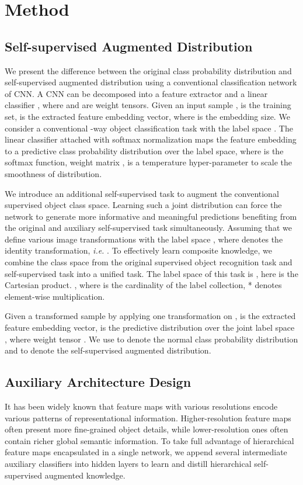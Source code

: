 \documentclass{article}
\begin{document}
\section{Method}
\subsection{Self-supervised Augmented Distribution}
We present the difference between the original class probability distribution and self-supervised augmented distribution using a conventional classification network of CNN. A CNN can be decomposed into a feature extractor  and a linear classifier , where  and  are weight tensors. Given an input sample ,  is the training set,  is the extracted feature embedding vector, where  is the embedding size. We consider a conventional -way object classification task with the label space . The linear classifier attached with softmax normalization maps the feature embedding  to a predictive class probability distribution  over the label space, where  is the softmax function, weight matrix ,  is a temperature hyper-parameter to scale the smoothness of distribution.

We introduce an additional self-supervised task to augment the conventional supervised object class space. Learning such a joint distribution can force the network to generate more informative and meaningful predictions benefiting from the original and auxiliary self-supervised task simultaneously. Assuming that we define  various image transformations  with the label space , where  denotes the identity transformation, \emph{i.e.} . To effectively learn composite knowledge, we combine the class space from the original supervised object recognition task and self-supervised task into a unified task. The label space of this task is , here  is the Cartesian product. , where  is the cardinality of the label collection, * denotes element-wise multiplication.

Given a transformed sample  by applying one transformation on ,  is the extracted feature embedding vector,  is the predictive distribution over the joint label space , where weight tensor . We use  to denote the normal class probability distribution and  to denote the self-supervised augmented distribution.

\subsection{Auxiliary Architecture Design}
It has been widely known that feature maps with various resolutions encode various patterns of representational information. Higher-resolution feature maps often present more fine-grained object details, while lower-resolution ones often contain richer global semantic information. To take full advantage of hierarchical feature maps encapsulated in a single network, we append several intermediate auxiliary classifiers into hidden layers to learn and distill hierarchical self-supervised augmented knowledge.
\end{document}
